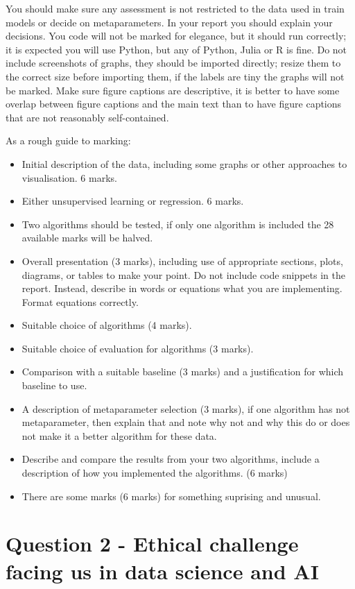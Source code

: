 \documentclass[12pt]{article}
\begin{document}
You should make sure any assessment is not restricted to the data used
in train models or decide on metaparameters. In your report you should
explain your decisions. You code will not be marked for elegance, but
it should run correctly; it is expected you will use Python, but any
of Python, Julia or R is fine. Do not include screenshots of graphs,
they should be imported directly; resize them to the correct size
before importing them, if the labels are tiny the graphs will not be
marked. Make sure figure captions are descriptive, it is better to
have some overlap between figure captions and the main text than to
have figure captions that are not reasonably self-contained.

As a rough guide to marking:
\begin{itemize}
\item Initial description of the data, including some graphs or other approaches to visualisation. 6 marks.
\item Either unsupervised learning or regression. 6 marks.
\item Two algorithms should be tested, if only one algorithm is
  included the 28 available marks will be halved.
\item Overall presentation (3 marks), including use of appropriate
  sections, plots, diagrams, or tables to make your point. Do not
  include code snippets in the report. Instead, describe in words or
  equations what you are implementing. Format equations correctly.
\item Suitable choice of algorithms (4 marks).
\item Suitable choice of evaluation for algorithms (3 marks).
\item Comparison with a suitable baseline (3 marks) and a justification for which baseline to use.
\item A description of metaparameter selection (3 marks), if one
  algorithm has not metaparameter, then explain that and note why not
  and why this do or does not make it a better algorithm for these
  data.
\item Describe and compare the results from your two algorithms,
  include a description of how you implemented the algorithms. (6 marks)
\item There are some marks (6 marks) for something suprising and unusual.
\end{itemize}




\section*{Question 2 - Ethical challenge facing us in data science and AI}
\end{document}
